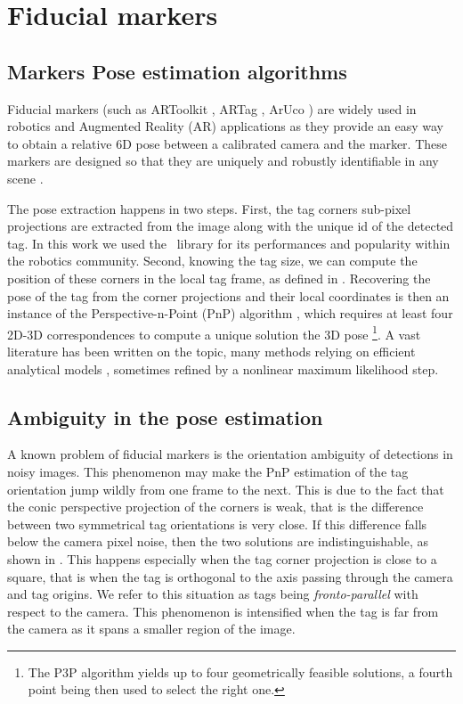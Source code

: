 %
%
\section{Fiducial markers}
\label{sec:fiducial_markers}
\subsection{Markers Pose estimation algorithms}

Fiducial markers (such as ARToolkit \cite{kato1999marker}, ARTag \cite{fiala2005artag}, ArUco \cite{garrido2014automatic}) are widely used in robotics 
and Augmented Reality (AR) applications as they provide an easy way to obtain a relative 6D pose 
between a calibrated camera and the marker. These markers are designed so that they are uniquely and robustly identifiable in any scene 
\cite{wang2016iros,romero2018speeded}. 

The pose extraction happens in two steps. First, the tag corners sub-pixel projections are extracted from the image along with the unique id of the detected tag. 
In this work we used the \apriltag\ library \cite{wang2016iros} for its performances and popularity within the robotics community. Second, knowing the tag size, 
we can compute the position of these corners in the local tag frame, as defined in . Recovering the pose of the tag from the 
corner projections and their local coordinates is then an instance 
of the Perspective-n-Point (PnP) algorithm \cite{gao2003complete}, which requires at least four 2D-3D correspondences to compute a unique solution the 3D pose 
\footnote{The P3P algorithm yields up to four geometrically feasible solutions, a fourth point being then used to select the right one.}. 
A vast literature has been written on the topic, many methods relying on efficient analytical models
\cite{gao2003complete, lepetit2009epnp, collins2014infinitesimal, terzakis2020consistently}, sometimes refined by a nonlinear maximum likelihood step.




\subsection{Ambiguity in the pose estimation}
\label{sec:tag_ambiguity}

A known problem of fiducial markers is the orientation ambiguity of detections in noisy images. This phenomenon may make the PnP estimation of the 
tag orientation jump wildly from one frame to the next. This is due to the fact that the conic perspective projection of the corners is weak, 
that is the difference between two symmetrical tag orientations is very close. If this difference falls below the camera pixel noise, 
then the two solutions are indistinguishable, as shown in . This happens especially when the tag corner projection is 
close to a square, that is when the tag is orthogonal to the axis passing through the camera and tag origins. 
We refer to this situation as tags being \textit{fronto-parallel} with respect to the camera.
This phenomenon is intensified when the tag is far from the camera as it spans a smaller region of the image. 

